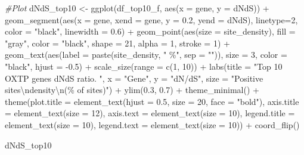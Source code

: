 \documentclass[
]{article}
\newenvironment{Shaded}{\begin{snugshade}}{\end{snugshade}}
\newcommand{\AttributeTok}[1]{\textcolor[rgb]{0.77,0.63,0.00}{#1}}
\newcommand{\CommentTok}[1]{\textcolor[rgb]{0.56,0.35,0.01}{\textit{#1}}}
\newcommand{\DecValTok}[1]{\textcolor[rgb]{0.00,0.00,0.81}{#1}}
\newcommand{\FloatTok}[1]{\textcolor[rgb]{0.00,0.00,0.81}{#1}}
\newcommand{\FunctionTok}[1]{\textcolor[rgb]{0.00,0.00,0.00}{#1}}
\newcommand{\NormalTok}[1]{#1}
\newcommand{\OtherTok}[1]{\textcolor[rgb]{0.56,0.35,0.01}{#1}}
\newcommand{\SpecialCharTok}[1]{\textcolor[rgb]{0.00,0.00,0.00}{#1}}
\newcommand{\StringTok}[1]{\textcolor[rgb]{0.31,0.60,0.02}{#1}}
\begin{document}
\begin{Shaded}
\begin{Highlighting}[]
\CommentTok{\#Plot}
\NormalTok{dNdS\_top10 }\OtherTok{\textless{}{-}} \FunctionTok{ggplot}\NormalTok{(df\_top10\_f, }\FunctionTok{aes}\NormalTok{(}\AttributeTok{x =}\NormalTok{ gene, }\AttributeTok{y =}\NormalTok{ dNdS)) }\SpecialCharTok{+}
  \FunctionTok{geom\_segment}\NormalTok{(}\FunctionTok{aes}\NormalTok{(}\AttributeTok{x =}\NormalTok{ gene, }\AttributeTok{xend =}\NormalTok{ gene, }\AttributeTok{y =} \FloatTok{0.2}\NormalTok{, }\AttributeTok{yend =}\NormalTok{ dNdS), }\AttributeTok{linetype=}\DecValTok{2}\NormalTok{, }\AttributeTok{color =} \StringTok{"black"}\NormalTok{, }\AttributeTok{linewidth =} \FloatTok{0.6}\NormalTok{) }\SpecialCharTok{+}
  \FunctionTok{geom\_point}\NormalTok{(}\FunctionTok{aes}\NormalTok{(}\AttributeTok{size =}\NormalTok{ site\_density), }\AttributeTok{fill =} \StringTok{"gray"}\NormalTok{, }\AttributeTok{color =} \StringTok{"black"}\NormalTok{, }\AttributeTok{shape =} \DecValTok{21}\NormalTok{, }\AttributeTok{alpha =} \DecValTok{1}\NormalTok{, }\AttributeTok{stroke =} \DecValTok{1}\NormalTok{) }\SpecialCharTok{+}
  \FunctionTok{geom\_text}\NormalTok{(}\FunctionTok{aes}\NormalTok{(}\AttributeTok{label =} \FunctionTok{paste}\NormalTok{(site\_density, }\StringTok{" \%"}\NormalTok{, }\AttributeTok{sep =} \StringTok{""}\NormalTok{)), }\AttributeTok{size =} \DecValTok{3}\NormalTok{, }\AttributeTok{color =} \StringTok{"black"}\NormalTok{, }\AttributeTok{hjust =} \SpecialCharTok{{-}}\FloatTok{0.5}\NormalTok{) }\SpecialCharTok{+}
  \FunctionTok{scale\_size}\NormalTok{(}\AttributeTok{range =} \FunctionTok{c}\NormalTok{(}\DecValTok{1}\NormalTok{, }\DecValTok{10}\NormalTok{)) }\SpecialCharTok{+}
  \FunctionTok{labs}\NormalTok{(}\AttributeTok{title =} \StringTok{"Top 10 OXTP genes dNdS ratio. "}\NormalTok{,}
       \AttributeTok{x =} \StringTok{"Gene"}\NormalTok{,}
       \AttributeTok{y =} \StringTok{"dN/dS"}\NormalTok{,}
       \AttributeTok{size =} \StringTok{"Positive sites}\SpecialCharTok{\textbackslash{}n}\StringTok{density}\SpecialCharTok{\textbackslash{}n}\StringTok{(\% of sites)"}\NormalTok{) }\SpecialCharTok{+}
  \FunctionTok{ylim}\NormalTok{(}\FloatTok{0.3}\NormalTok{, }\FloatTok{0.7}\NormalTok{) }\SpecialCharTok{+}
  \FunctionTok{theme\_minimal}\NormalTok{() }\SpecialCharTok{+}
  \FunctionTok{theme}\NormalTok{(}\AttributeTok{plot.title =} \FunctionTok{element\_text}\NormalTok{(}\AttributeTok{hjust =} \FloatTok{0.5}\NormalTok{, }\AttributeTok{size =} \DecValTok{20}\NormalTok{, }\AttributeTok{face =} \StringTok{"bold"}\NormalTok{),}
        \AttributeTok{axis.title =} \FunctionTok{element\_text}\NormalTok{(}\AttributeTok{size =} \DecValTok{12}\NormalTok{),}
        \AttributeTok{axis.text =} \FunctionTok{element\_text}\NormalTok{(}\AttributeTok{size =} \DecValTok{10}\NormalTok{),}
        \AttributeTok{legend.title =} \FunctionTok{element\_text}\NormalTok{(}\AttributeTok{size =} \DecValTok{10}\NormalTok{),}
        \AttributeTok{legend.text =} \FunctionTok{element\_text}\NormalTok{(}\AttributeTok{size =} \DecValTok{10}\NormalTok{)) }\SpecialCharTok{+} 
  \FunctionTok{coord\_flip}\NormalTok{()}

\NormalTok{dNdS\_top10}
\end{Highlighting}
\end{Shaded}
\end{document}
